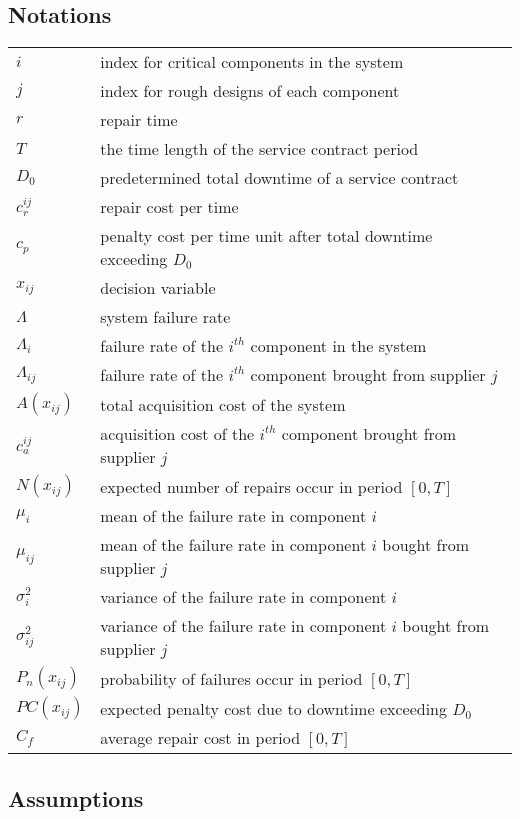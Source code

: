 \documentclass[preprint,12pt]{elsarticle}
\begin{document}
   \subsection{Notations}
   \begin{tabular}{l l}
$i$ & index for critical components in the system\\
$j$ & index for rough designs of each component\\
$r$ & repair time\\
$T$ & the time length of the service contract period\\
$D_0$ & predetermined total downtime of a service contract\\
$c_r^{ij}$ & repair cost per time\\
$c_p$ & penalty cost per time unit after total downtime exceeding $D_0$ \\
$x_{ij}$ & decision variable\\
$\Lambda$    & system failure rate\\
$\Lambda_{i}$  & failure rate of the $i^{th}$ component in the system \\
$\Lambda_{ij}$ & failure rate of the $i^{th}$ component brought from supplier $j$ \\
$A(x_{ij})$  & total acquisition cost of the system\\
$c^{ij}_{a}$ & acquisition cost of the $i^{th}$ component brought from supplier $j$\\
$N(x_{ij})$ & expected number of repairs occur in period $[0, T]$\\
$\mu_{i}$ & mean of the failure rate in component $i$ \\
$\mu_{ij}$ & mean of the failure rate in component $i$ bought from supplier $j$ \\
$\sigma_{i}^{2}$ &  variance of the failure rate in component $i$ \\
$\sigma_{ij}^{2}$ & variance of the failure rate in component $i$ bought from supplier $j$ \\
$P_{n}(x_{ij})$  & probability of   failures occur in period $[0, T]$ \\
$PC(x_{ij})$ & expected penalty cost due to downtime exceeding $D_{0}$ \\
$C_f$    & average repair cost in period $[0, T]$

	\end{tabular}
	 \subsection{Assumptions}
	
\end{document}
